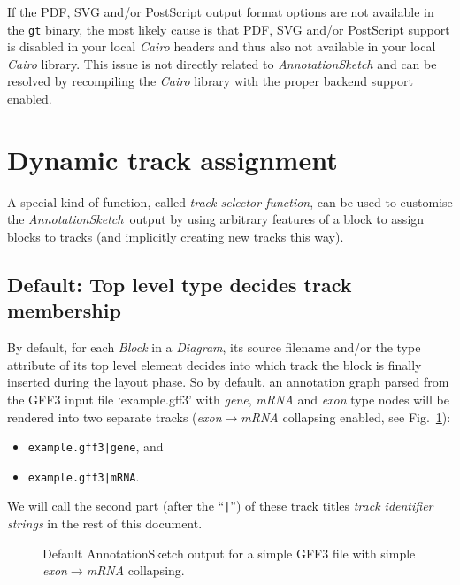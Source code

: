 \documentclass[a4paper]{scrreprt}
\newcommand{\AnnotationSketch}{\emph{AnnotationSketch}\ }
\begin{document}
If the PDF, SVG and/or PostScript output format options are not available in the \texttt{gt} binary, the most likely cause is that PDF, SVG and/or PostScript support is disabled in your local \emph{Cairo} headers and thus also not available in your local \emph{Cairo} library. This issue is not directly related to \emph{AnnotationSketch} and can be resolved by recompiling the \emph{Cairo} library with the proper backend support enabled.

\section{Dynamic track assignment}
A special kind of function, called \emph{track selector function}, can be used to customise the \AnnotationSketch output by using arbitrary features of a block to assign blocks to tracks (and implicitly creating new tracks this way).

\subsection{Default: Top level type decides track membership}
By default, for each \emph{Block} in a \emph{Diagram}, its source filename and/or the type attribute of its top level element decides into which track the block is finally inserted during the layout phase. So by default, an annotation graph parsed from the GFF3 input file `example.gff3' with \emph{gene}, \emph{mRNA} and \emph{exon} type nodes will be rendered into two separate tracks (\emph{exon}$\to$\emph{mRNA} collapsing enabled, see Fig.~\ref{tsexample1}):

\begin{itemize}
    \item \texttt{example.gff3|gene}, and
    \item \texttt{example.gff3|mRNA}.
\end{itemize}
We will call the second part (after the ``\texttt{|}'') of these track titles \emph{track identifier strings} in the rest of this document.

\begin{figure}[ht]
\caption{Default AnnotationSketch output for a simple GFF3 file with simple \emph{exon}$\to$\emph{mRNA} collapsing.}
\label{tsexample1}
\end{figure}
\end{document}
